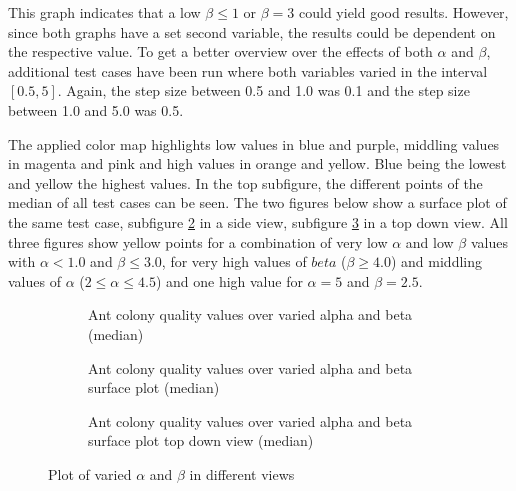 This graph indicates that a low $\beta \leq 1$ or $\beta = 3$ could yield good results.
However, since both graphs have a set second variable, the results could be dependent on the respective value.
To get a better overview over the effects of both $\alpha$ and $\beta$, additional test cases have been run where both variables varied in the interval $[0.5, 5]$.
Again, the step size between 0.5 and 1.0 was 0.1 and the step size between 1.0 and 5.0 was 0.5.

The applied color map highlights low values in blue and purple, middling values in magenta and pink and high values in orange and yellow.
Blue being the lowest and yellow the highest values.
In the top subfigure, the different points of the median of all test cases can be seen.
The two figures below show a surface plot of the same test case, subfigure \ref{fig:antColonyCasesAlphaAndBetaVariedMedSurface} in a side view, subfigure \ref{fig:antColonyCasesAlphaAndBetaVariedMedTopDown} in a top down view. 
All three figures show yellow points for a combination of very low $\alpha$ and low $\beta$ values with $\alpha < 1.0$ and $\beta \leq 3.0$, for very high values of $beta$ ($\beta \geq 4.0$) and middling values of $\alpha$ ($2 \leq \alpha \leq 4.5$) and one high value for $\alpha = 5$ and $\beta = 2.5$.

\begin{figure}[H]
	\centering
	\begin{subfigure}[H]{\textwidth}
		
		\caption{Ant colony quality values over varied alpha and beta (median)}
		\label{fig:antColonyCasesAlphaAndBetaVariedMed}
	\end{subfigure}
	
	\begin{subfigure}{\textwidth}
		
		\caption{Ant colony quality values over varied alpha and beta surface plot (median)}
		\label{fig:antColonyCasesAlphaAndBetaVariedMedSurface}
	\end{subfigure}
	
	\begin{subfigure}{\textwidth}
		
		\caption{Ant colony quality values over varied alpha and beta surface plot top down view (median)}
		\label{fig:antColonyCasesAlphaAndBetaVariedMedTopDown}
	\end{subfigure}
	\caption{Plot of varied $\alpha$ and $\beta$ in different views}
	\label{fig:antColonyCasesAlphaAndBetaVariedMedAll}
\end{figure}





